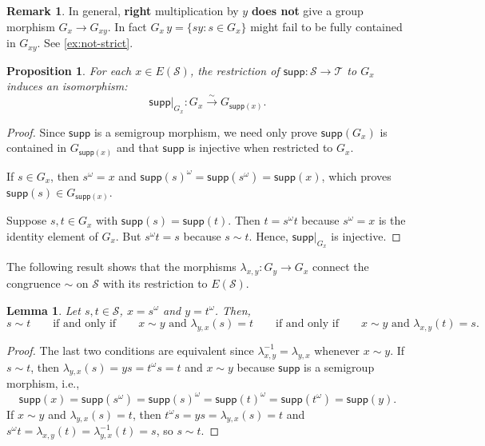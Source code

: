 \documentclass[11pt, oneside, reqno]{amsart}
\newtheorem{lemma}[theorem]{Lemma}
\newtheorem{prop}[theorem]{Proposition}
\theoremstyle{definition}
\newtheorem{remark}[theorem]{Remark}
\numberwithin{equation}{section}
\def \SS{{\mathcal{S}}}
\def \TT{{\mathcal{T}}}
\def\qqiff{\qquad\text{if and only if}\qquad}
\def \supp{\mathsf{supp}}
\begin{document}
\begin{remark}
    In general, \textbf{right} multiplication by $y$ \textbf{does not} give a group morphism $G_x \to G_{xy}$.
    In fact $G_x \, y = \{ sy : s \in G_x \}$ might fail to be fully contained in $G_{xy}$.
    See \cref{ex:not-strict}.
\end{remark}

\begin{prop}
    For each $x \in E(\SS)$, the restriction of $\supp: \SS \to \TT$ to $G_{x}$
    induces an isomorphism:
    \begin{equation}
        \supp\big|_{G_x} : G_x \xrightarrow{~\sim~} G_{\supp(x)}.
    \end{equation}
\end{prop}

\begin{proof}
    Since $\supp$ is a semigroup morphism,
    we need only prove
    $\supp(G_{x})$ is contained in $G_{\supp(x)}$
    and that $\supp$ is injective when restricted to $G_{x}$.

    If $s \in G_{x}$, then $s^\omega = x$ and
    $\supp(s)^\omega = \supp(s^\omega) = \supp(x)$,
    which proves $\supp(s) \in G_{\supp(x)}$.

    Suppose $s, t \in G_{x}$ with $\supp(s) = \supp(t)$.
    Then $t = s^\omega t$ because $s^\omega = x$ is the identity element of $G_{x}$.
    But $s^\omega t = s$ because $s \sim t$. Hence, $\supp|_{G_{x}}$ is injective.
\end{proof}

The following result shows that the morphisms $\lambda_{x,y}: G_{y} \to G_x$
connect the congruence $\sim$ on $\SS$ with its restriction to $E(\SS)$.

\begin{lemma} \label{p:lambda-cong}
    Let $s,t \in \SS$, $x = s^\omega$ and $y = t^\omega$.
    Then,
    \[
        s \sim t
        \qqiff
        x \sim y \text{ and } \lambda_{y,x}(s) = t
        \qqiff
        x \sim y \text{ and } \lambda_{x,y}(t) = s.
    \]
\end{lemma}

\begin{proof}
    The last two conditions are equivalent since $\lambda_{x,y}^{-1}
    = \lambda_{y,x}$ whenever $x \sim y$.
    If $s \sim t$, then $\lambda_{y,x}(s) = ys = t^\omega s = t$ and
    $x \sim y$ because $\supp$ is a semigroup morphism, i.e.,
    \begin{equation*}
        \supp(x) = \supp(s^\omega) = \supp(s)^\omega = \supp(t)^\omega = \supp(t^\omega) = \supp(y).
    \end{equation*}
    If $x \sim y$ and $\lambda_{y,x}(s) = t$, then $t^\omega
    s = y s = \lambda_{y,x}(s) = t$ and $s^\omega t = \lambda_{x,y}(t)
    = \lambda_{y,x}^{-1}(t) = s$, so $s \sim t$.
\end{proof}
\end{document}
